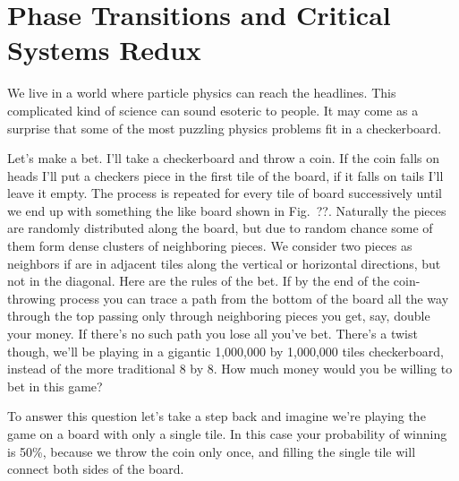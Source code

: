 \chapter{Phase Transitions and Critical Systems Redux}
\label{ch:criticality}


We live in a world where particle physics can reach the headlines. This
complicated kind of science can sound esoteric to people. It may come as a
surprise that some of the most puzzling physics problems fit in a checkerboard.

Let's make a bet. I'll take a checkerboard and throw a coin. If the coin falls
on heads I'll put a checkers piece in the first tile of the board, if it falls
on tails I'll leave it empty. The process is repeated for every tile of board
successively until we end up with something the like board shown in Fig.~??.
Naturally the pieces are randomly distributed along the board, but due to
random chance some of them form dense clusters of neighboring pieces. We
consider two pieces as neighbors if are in adjacent tiles along the vertical or
horizontal directions, but not in the diagonal. Here are the rules of the bet.
If by the end of the coin-throwing process you can trace a path from the bottom
of the board all the way through the top passing only through neighboring
pieces you get, say, double your money. If there's no such path you lose all
you've bet. There's a twist though, we'll be playing in a gigantic 1,000,000 by
1,000,000 tiles checkerboard, instead of the more traditional 8 by 8. How much
money would you be willing to bet in this game?

To answer this question let's take a step back and imagine we're playing the
game on a board with only a single tile. In this case your probability of
winning is 50\%, because we throw the coin only once, and filling the single
tile will connect both sides of the board.

